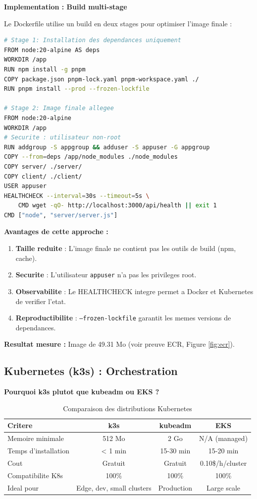 \documentclass[12pt,a4paper,french]{report}
\begin{document}
\textbf{Implementation : Build multi-stage}

Le Dockerfile utilise un build en deux stages pour optimiser l'image finale :

\begin{lstlisting}[language=bash, caption=Dockerfile multi-stage (extrait)]
# Stage 1: Installation des dependances uniquement
FROM node:20-alpine AS deps
WORKDIR /app
RUN npm install -g pnpm
COPY package.json pnpm-lock.yaml pnpm-workspace.yaml ./
RUN pnpm install --prod --frozen-lockfile

# Stage 2: Image finale allegee
FROM node:20-alpine
WORKDIR /app
# Securite : utilisateur non-root
RUN addgroup -S appgroup && adduser -S appuser -G appgroup
COPY --from=deps /app/node_modules ./node_modules
COPY server/ ./server/
COPY client/ ./client/
USER appuser
HEALTHCHECK --interval=30s --timeout=5s \
    CMD wget -qO- http://localhost:3000/api/health || exit 1
CMD ["node", "server/server.js"]
\end{lstlisting}

\textbf{Avantages de cette approche :}
\begin{enumerate}
    \item \textbf{Taille reduite} : L'image finale ne contient pas les outils de build (npm, cache).
    \item \textbf{Securite} : L'utilisateur \texttt{appuser} n'a pas les privileges root.
    \item \textbf{Observabilite} : Le HEALTHCHECK integre permet a Docker et Kubernetes de verifier l'etat.
    \item \textbf{Reproductibilite} : \texttt{--frozen-lockfile} garantit les memes versions de dependances.
\end{enumerate}

\textbf{Resultat mesure :} Image de 49.31 Mo (voir preuve ECR, Figure \ref{fig:ecr}).

\subsection{Kubernetes (k3s) : Orchestration}

\textbf{Pourquoi k3s plutot que kubeadm ou EKS ?}

\begin{table}[H]
    \centering
    \begin{tabular}{|l|c|c|c|}
        \hline
        \textbf{Critere} & \textbf{k3s} & \textbf{kubeadm} & \textbf{EKS} \\
        \hline
        Memoire minimale & 512 Mo & 2 Go & N/A (managed) \\
        Temps d'installation & < 1 min & 15-30 min & 15-20 min \\
        Cout & Gratuit & Gratuit & 0.10\$/h/cluster \\
        Compatibilite K8s & 100\% & 100\% & 100\% \\
        Ideal pour & Edge, dev, small clusters & Production & Large scale \\
        \hline
    \end{tabular}
    \caption{Comparaison des distributions Kubernetes}
    \label{table:k8s-comparison}
\end{table}
\end{document}
